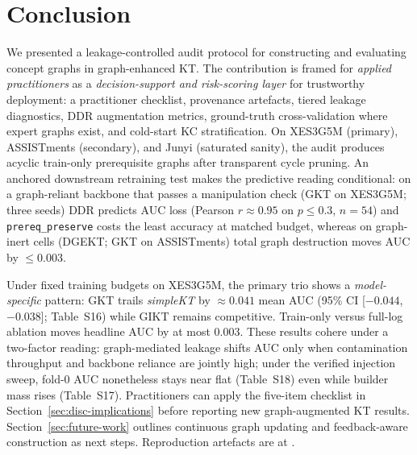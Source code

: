 \documentclass[pdflatex,sn-mathphys-num]{sn-jnl}
\newcommand{\DDR}{\textsc{DDR}}
\newcommand{\GKTdeltaci}{[$-0.044$, $-0.038$]}
\begin{document}
\section{Conclusion}
\label{sec:concl}
We presented a leakage-controlled audit protocol for constructing and
evaluating concept graphs in graph-enhanced KT. The contribution is framed for
\emph{applied practitioners} as a \emph{decision-support and risk-scoring
layer} for trustworthy deployment: a
practitioner checklist, provenance artefacts, tiered leakage diagnostics,
\DDR{} augmentation metrics, ground-truth cross-validation where expert graphs
exist, and cold-start KC stratification. On XES3G5M (primary), ASSISTments (secondary), and Junyi (saturated sanity),
the audit produces acyclic train-only prerequisite graphs after transparent
cycle pruning. An anchored downstream retraining test makes the predictive
reading conditional: on a graph-reliant backbone that passes a manipulation
check (GKT on XES3G5M; three seeds) \DDR{} predicts AUC loss (Pearson
$r{\approx}0.95$ on $p{\le}0.3$, $n{=}54$) and \texttt{prereq\_preserve} costs
the least accuracy at matched budget, whereas on graph-inert cells (DGEKT; GKT
on ASSISTments) total graph destruction moves AUC by ${\le}0.003$.

Under fixed training budgets on XES3G5M, the primary trio shows a
\emph{model-specific} pattern: GKT trails \textit{simpleKT} by
${\approx}0.041$ mean AUC (95\% CI \GKTdeltaci{}; Table~S16) while GIKT
remains competitive. Train-only versus full-log ablation moves headline AUC by
at most $0.003$. These results cohere under a two-factor reading: graph-mediated
leakage shifts AUC only when contamination throughput and backbone reliance are
jointly high; under the verified injection sweep, fold-0 AUC nonetheless stays
near flat (Table~S18) even while builder mass rises (Table~S17). Practitioners
can apply the five-item checklist in Section~\ref{sec:disc-implications}
before reporting new graph-augmented KT results. Section~\ref{sec:future-work}
outlines continuous graph updating and feedback-aware construction as next
steps.
Reproduction artefacts are at
.

\appendix
\end{document}
